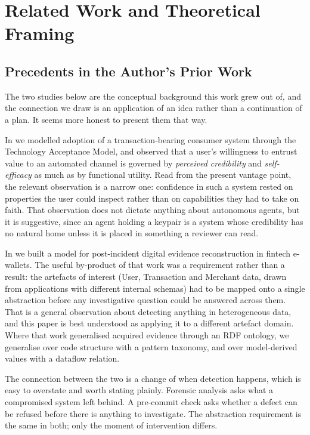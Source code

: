 \section{Related Work and Theoretical Framing}

\subsection{Precedents in the Author's Prior Work}

The two studies below are the conceptual background this work grew out of,
and the connection we draw is an application of an idea rather than a
continuation of a plan. It seems more honest to present them that way.

In \cite{firmansyah2022efficacy} we modelled adoption of a transaction-bearing
consumer system through the Technology Acceptance Model, and observed that a
user's willingness to entrust value to an automated channel is governed by
\emph{perceived credibility} and \emph{self-efficacy} as much as by functional
utility. Read from the present vantage point, the relevant observation is a
narrow one: confidence in such a system rested on properties the user could
inspect rather than on capabilities they had to take on faith. That observation
does not dictate anything about autonomous agents, but it is suggestive, since
an agent holding a keypair is a system whose credibility has no natural home
unless it is placed in something a reviewer can read.

In \cite{firmansyah2024forensic} we built a model for post-incident digital
evidence reconstruction in fintech e-wallets. The useful by-product of that work
was a requirement rather than a result: the artefacts of interest (User,
Transaction and Merchant data, drawn from applications with different internal
schemas) had to be mapped onto a single abstraction before any investigative
question could be answered across them. That is a general observation about
detecting anything in heterogeneous data, and this paper is best understood as
applying it to a different artefact domain. Where that work generalised acquired
evidence through an RDF ontology, we generalise over code structure with a
pattern taxonomy, and over model-derived values with a dataflow relation.

The connection between the two is a change of when detection happens, which is
easy to overstate and worth stating plainly. Forensic analysis asks what a
compromised system left behind. A pre-commit check asks whether a defect can be
refused before there is anything to investigate. The abstraction requirement is
the same in both; only the moment of intervention differs.

